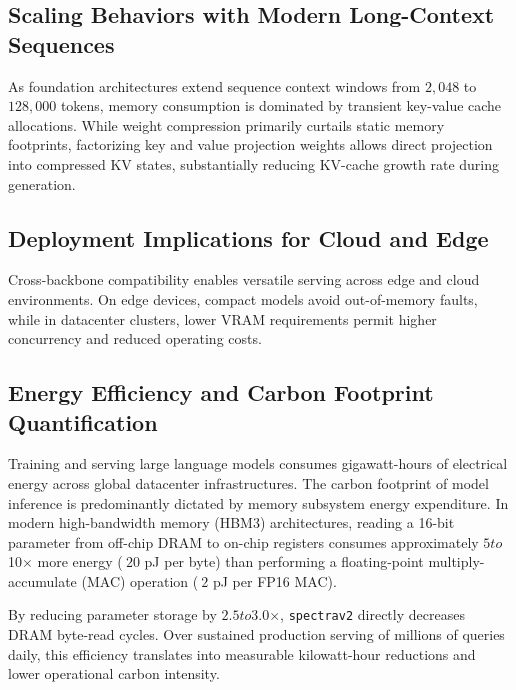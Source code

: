 \subsection{Scaling Behaviors with Modern Long-Context Sequences}
As foundation architectures extend sequence context windows from $2{,}048$ to $128{,}000$ tokens, memory consumption is dominated by transient key-value cache allocations. While weight compression primarily curtails static memory footprints, factorizing key and value projection weights allows direct projection into compressed KV states, substantially reducing KV-cache growth rate during generation.

\subsection{Deployment Implications for Cloud and Edge}
Cross-backbone compatibility enables versatile serving across edge and cloud environments. On edge devices, compact models avoid out-of-memory faults, while in datacenter clusters, lower VRAM requirements permit higher concurrency and reduced operating costs.

\subsection{Energy Efficiency and Carbon Footprint Quantification}
Training and serving large language models consumes gigawatt-hours of electrical energy across global datacenter infrastructures. The carbon footprint of model inference is predominantly dictated by memory subsystem energy expenditure. In modern high-bandwidth memory (HBM3) architectures, reading a 16-bit parameter from off-chip DRAM to on-chip registers consumes approximately $5$\times$ to $10$\times$ more energy ($~20$ pJ per byte) than performing a floating-point multiply-accumulate (MAC) operation ($~2$ pJ per FP16 MAC).

By reducing parameter storage by $2.5$\times$ to $3.0$\times$, \texttt{spectrav2} directly decreases DRAM byte-read cycles. Over sustained production serving of millions of queries daily, this efficiency translates into measurable kilowatt-hour reductions and lower operational carbon intensity.

